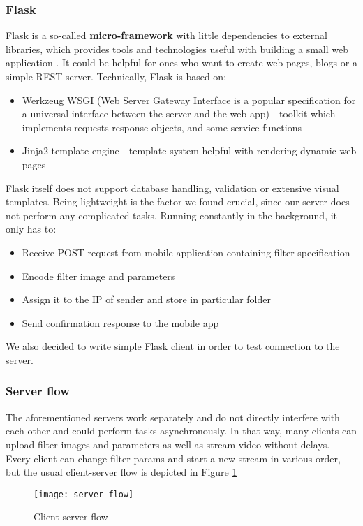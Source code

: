 \documentclass[../Main.tex]{subfiles}
\begin{document}
    \subsubsection{Flask}
    Flask is a so-called \textbf{micro-framework} with little dependencies to external libraries, which provides tools and technologies useful with building a small web application \cite{flaskdocs}. It could be helpful for ones who want to create web pages, blogs or a simple REST server. 
    Technically, Flask is based on:
    \begin{itemize}
    \item Werkzeug WSGI (Web Server Gateway Interface is a popular specification for a universal interface between the  server and the web app) - toolkit which implements requests-response objects, and some service functions
    \item Jinja2 template engine - template system helpful with rendering dynamic web pages
    \end{itemize}
    Flask itself does not support database handling, validation or extensive visual templates. Being lightweight is the factor we found crucial, since our server does not perform any complicated tasks. Running constantly in the background, it only has to:
    \begin{itemize}
    \item Receive POST request from mobile application containing filter specification 
    \item Encode filter image and parameters
    \item Assign it to the IP of sender and store in particular folder
    \item Send confirmation response to the mobile app
    \end{itemize}
    We also decided to write simple Flask client in order to test connection to the server.

    \subsubsection{Server flow}
    The aforementioned servers work separately and do not directly interfere with each other and could perform tasks asynchronously. In that way, many clients can upload filter images and parameters as well as stream video without delays. Every client can change filter params and start a new stream in various order, but the usual client-server flow is depicted in Figure \ref{fig:server-flow} \\
    \begin{figure}[h]
    \centering
    \texttt{[image: server-flow]}
    \caption{Client-server flow}
        \label{fig:server-flow}
    \end{figure}
    
\end{document}
